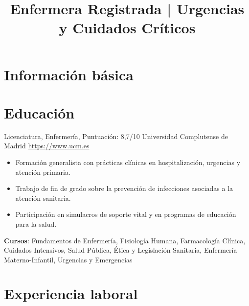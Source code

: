 \documentclass[a4paper, serif, 10pt]{moderncv}
\title{Enfermera Registrada | Urgencias y Cuidados Críticos}
\begin{document}
\maketitle

\section{Información básica}

\section{Educación}

        {Licenciatura, Enfermería, Puntuación: 8,7/10}
        {Universidad Complutense de Madrid}
        {\url{https://www.ucm.es}}
        {}
        {\begin{itemize}
\item Formación generalista con prácticas clínicas en hospitalización, urgencias y atención primaria.
\item Trabajo de fin de grado sobre la prevención de infecciones asociadas a la atención sanitaria.
\item Participación en simulacros de soporte vital y en programas de educación para la salud.
\end{itemize}
\textbf{Cursos}: Fundamentos de Enfermería, Fisiología Humana, Farmacología Clínica, Cuidados Intensivos, Salud Pública, Ética y Legislación Sanitaria, Enfermería Materno-Infantil, Urgencias y Emergencias}
\section{Experiencia laboral}
\end{document}
